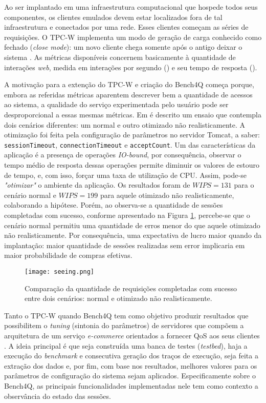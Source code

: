 Ao ser implantado em uma infraestrutura computacional que hospede todos seus componentes, os clientes emulados devem estar localizados fora de tal infraestrutura e conectados por uma rede. Esses clientes começam as séries de requisições. O TPC-W implementa um modo de geração de carga conhecido como fechado (\textit{close mode}): um novo cliente chega somente após o antigo deixar o sistema \cite{Zhang2011}. As métricas disponíveis concernem basicamente à quantidade de interações \textit{web}, medida em interações por segundo () e seu tempo de resposta ().

A motivação para a extenção do TPC-W e criação do Bench4Q começa porque, embora as referidas métricas aparentem descrever bem a quantidade de acessos ao sistema, a qualidade do serviço experimentada pelo usuário pode ser desproporcional a essas mesmas métricas. Em  é descrito um ensaio que contempla dois cenários diferentes: um normal e outro otimizado não realisticamente. A otimização foi feita pela configuração de parâmetros no servidor Tomcat, a saber: \texttt{sessionTimeout}, \texttt{connectionTimeout} e \texttt{acceptCount}. Um das características da aplicação é a presença de operações \textit{ IO-bound}, por consequência, observar o tempo médio de resposta dessas operações permite diminuir os valores de estouro de tempo, e, com isso, forçar uma taxa de utilização de CPU. Assim, pode-se \textit{"otimizar"} o ambiente da aplicação. Os resultados foram de $WIPS = 131$ para o cenário normal e $WIPS=199$ para aquele otimizado não realisticamente, colaborando a hipótese. Porém, ao observa-se a quantidade de sessões completadas com sucesso, conforme apresentado na Figura \ref{fig:seeing}, percebe-se que o cenário normal permitiu uma quantidade de erros menor do que aquele otimizado não realisticamente. Por consequência, uma expectativa de lucro maior quando da implantação: maior quantidade de sessões realizadas sem error implicaria em maior probabilidade de compras efetivas.

\begin{figure}[htb]
	\centering
	\texttt{[image: seeing.png]}
	\caption{Comparação da quantidade de requisições completadas com sucesso entre dois cenários: normal e otimizado não realisticamente.}
	\label{fig:seeing}
\end{figure}


Tanto o TPC-W quando Bench4Q tem como objetivo produzir resultados que possibilitem o \textit{tuning} (sintonia do parâmetros) de servidores que compõem a arquitetura de um serviço \textit{e-commerce} orientados a fornecer QoS aos seus clientes \cite{Menasce2002, Zhang2011}.  A ideia principal é que seja construída uma banca de testes (\textit{testbed}), haja a execução do \textit{benchmark} e consecutiva geração dos traços de execução, seja feita a extração dos dados e, por fim, com base nos resultados, melhores valores para os parâmetros de configuração do sistema sejam aplicados. Especificamente sobre o Bench4Q, as principais funcionalidades implementadas nele tem como contexto a observância do estado das sessões.


